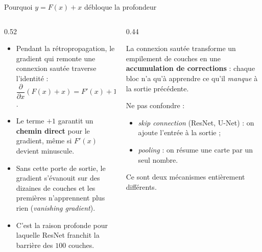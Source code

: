 \begin{frame}{Pourquoi $y = F(x) + x$ débloque la profondeur}
\begin{columns}[t]
\begin{column}{0.52\textwidth}
\begin{itemize}
  \item Pendant la rétropropagation, le gradient qui remonte une connexion
  sautée traverse l'identité : $\dfrac{\partial}{\partial x}(F(x)+x)
  = F'(x) + 1$.
  \item Le terme $+1$ garantit un \textbf{chemin direct} pour le gradient,
  même si $F'(x)$ devient minuscule.
  \item Sans cette porte de sortie, le gradient s'évanouit sur des dizaines
  de couches et les premières n'apprennent plus rien (\emph{vanishing
  gradient}).
  \item C'est la raison profonde pour laquelle ResNet franchit la barrière
  des $100$ couches.
\end{itemize}
\end{column}
\begin{column}{0.44\textwidth}
\begin{kbox}
La connexion sautée transforme un empilement de couches en une
\textbf{accumulation de corrections} : chaque bloc n'a qu'à apprendre
ce qu'il \emph{manque} à la sortie précédente.
\end{kbox}
\begin{wbox}
Ne pas confondre :
\begin{itemize}
  \item \emph{skip connection} (ResNet, U-Net) : on ajoute l'entrée
  à la sortie ;
  \item \emph{pooling} : on résume une carte par un seul nombre.
\end{itemize}
Ce sont deux mécanismes entièrement différents.
\end{wbox}
\end{column}
\end{columns}
\end{frame}

